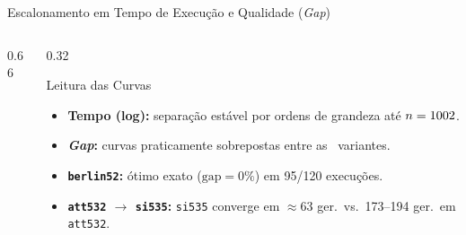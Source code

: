 \begin{frame}{Escalonamento em Tempo de Execução e Qualidade (\emph{Gap})}
  \begin{columns}[c,onlytextwidth]
    \begin{column}{0.66\textwidth}
    \end{column}
    \begin{column}{0.32\textwidth}
      \begin{block}{Leitura das Curvas}
        \begin{itemize}
          \item \textbf{Tempo (log):} separação estável por ordens de grandeza até $n=1002$.
          \item \textbf{\emph{Gap}:} curvas praticamente sobrepostas entre as \totalvariantes\ variantes.
          \item \textbf{\texttt{berlin52}:} ótimo exato ($\text{gap}=0\%$) em 95/120 execuções.
          \item \textbf{\texttt{att532} $\to$ \texttt{si535}:} \texttt{si535} converge em $\approx 63$ ger.\ vs.\ 173--194 ger.\ em \texttt{att532}.
        \end{itemize}
      \end{block}
    \end{column}
  \end{columns}
\end{frame}

